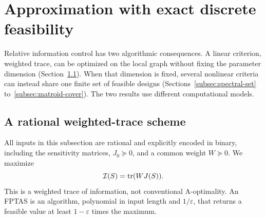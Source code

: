 \section{Approximation with exact discrete feasibility}
\label{sec:approximation}
Relative information control has two algorithmic consequences. A linear
criterion, weighted trace, can be optimized on the local graph without fixing
the parameter dimension (Section~\ref{subsec:trace-scheme}). When that
dimension is fixed, several nonlinear criteria can instead share one finite
set of feasible designs (Sections~\ref{subsec:spectral-set}
to~\ref{subsec:matroid-cover}). The two results use different computational
models.

\subsection{A rational weighted-trace scheme}
\label{subsec:trace-scheme}
All inputs in this subsection are rational and explicitly encoded in binary,
including the sensitivity matrices, $J_0\succeq0$, and a common weight
$W\succeq0$. We maximize
\[
 \mathcal I(S)=\operatorname{tr}(WJ(S)).
\]
This is a weighted trace of information, not conventional A-optimality.
An FPTAS is an algorithm, polynomial in input length and $1/\varepsilon$,
that returns a feasible value at least $1-\varepsilon$ times the maximum.

